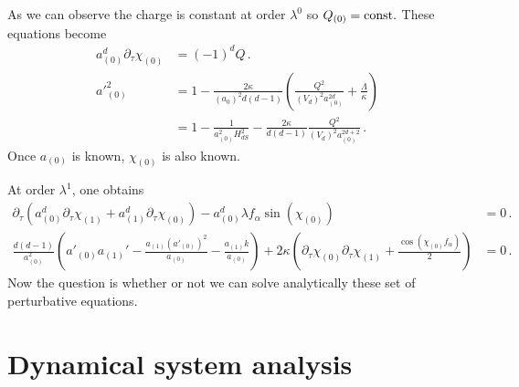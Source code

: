 \documentclass[a4paper]{article}
\begin{document}
As we can observe the charge is constant at order $\lambda^{0}$ so $Q_{(0)} = \rm const.$
These equations become
\begin{equation}
\begin{aligned}
  a^d_{(0)}\partial_{\tau}\chi_{(0)} &=(-1)^d Q\,.\\
  a'^2_{(0)} &=1-\frac{2\kappa}{(a_0)^2 d(d-1)}\left(\frac{Q^2}{(V_d)^2a_{(0)}^{2d}}+\frac{\Lambda}{\kappa}\right)\\
  &=1-\frac{1}{a_{(0)}^2H_{dS}^2}-\frac{2\kappa}{d(d-1)}\frac{Q^2}{(V_d)^2a_{(0)}^{2d+2}}\,.
\end{aligned}
\end{equation}
Once $a_{(0)}$ is known, $\chi_{(0)}$ is also known.

At order $\lambda^1$, one obtains
\begin{equation}
\begin{aligned}
  \partial_\tau\left(a_{(0)}^d \partial_\tau \chi_{(1)} + a_{(1)}^d \partial_\tau \chi_{(0)} \right)-a_{(0)}^d \lambda f_{\alpha}\sin(\chi_{(0)}) &=0\,.\\
  \frac{d(d-1)}{a_{(0)}^2}\left(a'_{(0)}a_{(1)}' - \frac{a_{(1)}(a'_{(0)})^2}{a_{(0)}}-\frac{a_{(1)}k}{a_{(0)}}\right)+2\kappa\left(\partial_\tau \chi_{(0)} \partial_\tau \chi_{(1)}+\frac{\cos(\chi_{(0)}f_{\alpha})}{2}\right)&=0\,.
\end{aligned}
\end{equation}
Now the question is whether or not we can solve analytically these set of perturbative equations.
\section{Dynamical system analysis}
\end{document}
